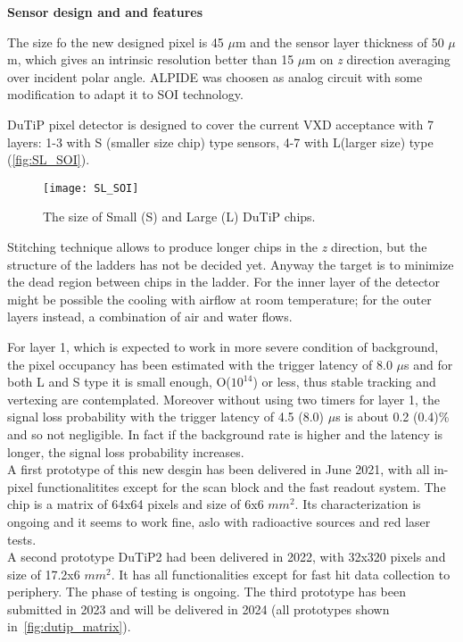 \begin{description}
\item \textbf{Sensor design and and features}
\end{description}

The size fo the new designed pixel is 45 $\mu$m and the sensor layer thickness of 50 $\mu$m, which gives an intrinsic resolution better than 15 $\mu$m on \textit{z} direction averaging over incident polar angle. ALPIDE was choosen as analog circuit with some modification to adapt it to SOI technology. 

DuTiP pixel detector is designed to cover the current VXD acceptance with 7 layers: 1-3 with S (smaller size chip) type sensors, 4-7 with L(larger size) type (\autoref{fig:SL_SOI}).

\begin{figure}[h!]
\centering
\texttt{[image: SL\_SOI]}
\caption{The size of Small (S) and Large (L) DuTiP chips.}
\label{fig:SL_SOI}
\end{figure}

Stitching technique allows to produce longer chips in the \textit{z} direction, but the structure of the ladders has not be decided yet. Anyway the target is to minimize the dead region between chips in the ladder. For the inner layer of the detector might be possible the cooling with airflow at room temperature; for the outer layers instead, a combination of air and water flows.

For layer 1, which is expected to work in more severe condition of background, the pixel occupancy has been estimated with the trigger latency of 8.0 $\mu$s and for both L and S type it is small enough, O($10^{14}$) or less, thus stable tracking and vertexing are contemplated. Moreover without using two timers for layer 1, the signal loss probability with the trigger latency of 4.5 (8.0) $\mu$s is about 0.2 (0.4)\% and so not negligible. In fact if the background rate is higher and the latency is longer, the signal loss probability increases.\\ 

A first prototype of this new desgin has been delivered in June 2021, with all in-pixel functionalitites except for the scan block and the fast readout system. The chip is a matrix of 64x64 pixels and size of 6x6 $mm^{2}$. Its characterization is ongoing and it seems to work fine, aslo with radioactive sources and red laser tests. \\
A second prototype DuTiP2 had been delivered in 2022, with 32x320 pixels and size of 17.2x6 $mm^{2}$. It has all functionalities except for fast hit data collection to periphery. The phase of testing is ongoing.
The third prototype has been submitted in 2023 and will be delivered in 2024 (all prototypes shown in~\autoref{fig:dutip_matrix}).


